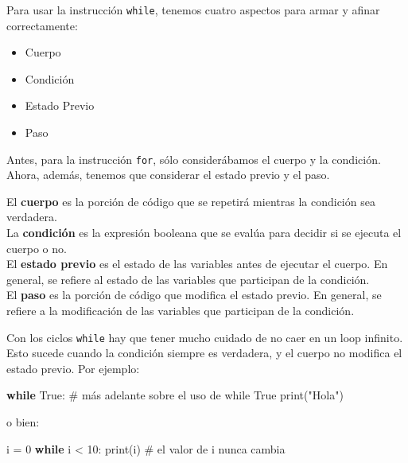 \documentclass[
  letterpaper,
  DIV=11,
  numbers=noendperiod]{scrreprt}
\newenvironment{Shaded}{\begin{snugshade}}{\end{snugshade}}
\newcommand{\BuiltInTok}[1]{\textcolor[rgb]{0.00,0.23,0.31}{#1}}
\newcommand{\CommentTok}[1]{\textcolor[rgb]{0.37,0.37,0.37}{#1}}
\newcommand{\ControlFlowTok}[1]{\textcolor[rgb]{0.00,0.23,0.31}{\textbf{#1}}}
\newcommand{\DecValTok}[1]{\textcolor[rgb]{0.68,0.00,0.00}{#1}}
\newcommand{\NormalTok}[1]{\textcolor[rgb]{0.00,0.23,0.31}{#1}}
\newcommand{\OperatorTok}[1]{\textcolor[rgb]{0.37,0.37,0.37}{#1}}
\newcommand{\StringTok}[1]{\textcolor[rgb]{0.13,0.47,0.30}{#1}}
\newcommand{\VariableTok}[1]{\textcolor[rgb]{0.07,0.07,0.07}{#1}}
\providecommand{\tightlist}{%
  \setlength{\itemsep}{0pt}\setlength{\parskip}{0pt}}\usepackage{longtable,booktabs,array}
\begin{document}
Para usar la instrucción \texttt{while}, tenemos cuatro aspectos para
armar y afinar correctamente:

\begin{itemize}
\tightlist
\item
  Cuerpo
\item
  Condición
\item
  Estado Previo
\item
  Paso
\end{itemize}

Antes, para la instrucción \texttt{for}, sólo considerábamos el cuerpo y
la condición. Ahora, además, tenemos que considerar el estado previo y
el paso.

El \textbf{cuerpo} es la porción de código que se repetirá mientras la
condición sea verdadera.\\
La \textbf{condición} es la expresión booleana que se evalúa para
decidir si se ejecuta el cuerpo o no.\\
El \textbf{estado previo} es el estado de las variables antes de
ejecutar el cuerpo. En general, se refiere al estado de las variables
que participan de la condición.\\
El \textbf{paso} es la porción de código que modifica el estado previo.
En general, se refiere a la modificación de las variables que participan
de la condición.\\

\begin{tcolorbox}[enhanced jigsaw, arc=.35mm, toptitle=1mm, colframe=quarto-callout-warning-color-frame, bottomtitle=1mm, opacitybacktitle=0.6, colbacktitle=quarto-callout-warning-color!10!white, leftrule=.75mm, coltitle=black, toprule=.15mm, titlerule=0mm, title=\textcolor{quarto-callout-warning-color}{\faExclamationTriangle}\hspace{0.5em}{Warning}, bottomrule=.15mm, rightrule=.15mm, colback=white, breakable, opacityback=0, left=2mm]

Con los ciclos \texttt{while} hay que tener mucho cuidado de no caer en
un loop infinito. Esto sucede cuando la condición siempre es verdadera,
y el cuerpo no modifica el estado previo. Por ejemplo:

\begin{Shaded}
\begin{Highlighting}[]
\ControlFlowTok{while} \VariableTok{True}\NormalTok{: }\CommentTok{\# más adelante sobre el uso de \textasciigrave{}while True\textasciigrave{}}
    \BuiltInTok{print}\NormalTok{(}\StringTok{"Hola"}\NormalTok{)}
\end{Highlighting}
\end{Shaded}

o bien:

\begin{Shaded}
\begin{Highlighting}[]
\NormalTok{i }\OperatorTok{=} \DecValTok{0}
\ControlFlowTok{while}\NormalTok{ i }\OperatorTok{\textless{}} \DecValTok{10}\NormalTok{:}
    \BuiltInTok{print}\NormalTok{(i) }\CommentTok{\# el valor de i nunca cambia}
\end{Highlighting}
\end{Shaded}

\end{tcolorbox}
\end{document}
